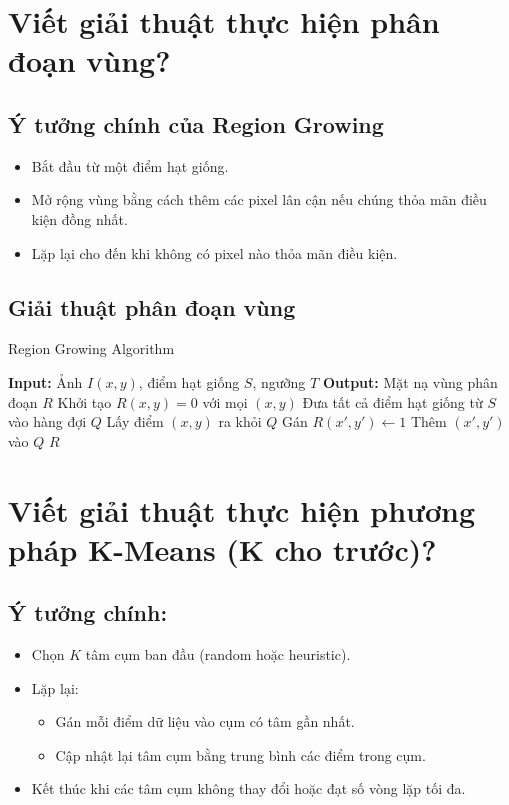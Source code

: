 \documentclass[12pt]{article}
\begin{document}
	\section{Viết giải thuật thực hiện phân đoạn vùng?}
	
	\subsection*{Ý tưởng chính của Region Growing}
	
	\begin{itemize}
	\item Bắt đầu từ một điểm hạt giống.
	\item Mở rộng vùng bằng cách thêm các pixel lân cận nếu chúng thỏa mãn điều kiện đồng nhất.
	\item Lặp lại cho đến khi không có pixel nào thỏa mãn điều kiện.
	\end{itemize}
	
	\subsection*{Giải thuật phân đoạn vùng}
	
	\begin{algorithm}[H]
	\caption{Region Growing Algorithm}
	\begin{algorithmic}[1]
	\State \textbf{Input:} Ảnh $I(x, y)$, điểm hạt giống $S$, ngưỡng $T$
	\State \textbf{Output:} Mặt nạ vùng phân đoạn $R$
	\State Khởi tạo $R(x, y) = 0$ với mọi $(x, y)$
	\State Đưa tất cả điểm hạt giống từ $S$ vào hàng đợi $Q$
	\State Lấy điểm $(x, y)$ ra khỏi $Q$
	\State Gán $R(x', y') \gets 1$
	\State Thêm $(x', y')$ vào $Q$
	\EndIf
	\EndFor
	\EndWhile
	\State \Return $R$
	\end{algorithmic}
	\end{algorithm}
	
	\section{Viết giải thuật thực hiện phương pháp K-Means (K cho trước)?}
	
	\subsection*{Ý tưởng chính:}
	
	\begin{itemize}
	\item Chọn $K$ tâm cụm ban đầu (random hoặc heuristic).
	\item Lặp lại:
	\begin{itemize}
	\item Gán mỗi điểm dữ liệu vào cụm có tâm gần nhất.
	\item Cập nhật lại tâm cụm bằng trung bình các điểm trong cụm.
	\end{itemize}
	\item Kết thúc khi các tâm cụm không thay đổi hoặc đạt số vòng lặp tối đa.
	\end{itemize}
	
\end{document}
